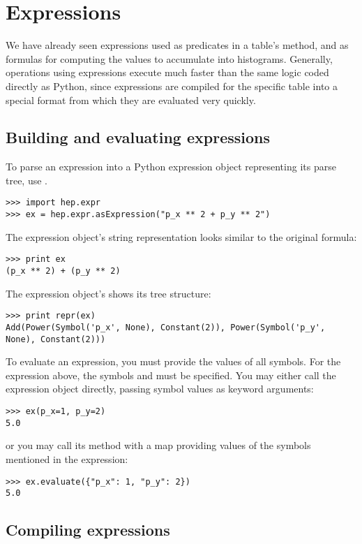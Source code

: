 \chapter{Expressions}

We have already seen expressions used as predicates in a table's
 method, and as formulas for computing the values to
accumulate into histograms.  Generally, operations using expressions
execute much faster than the same logic coded directly as Python, since
expressions are compiled for the specific table into a special format
from which they are evaluated very quickly.

\section{Building and evaluating expressions}

To parse an expression into a Python expression object representing its
parse tree, use .
\begin{verbatim}
>>> import hep.expr
>>> ex = hep.expr.asExpression("p_x ** 2 + p_y ** 2")
\end{verbatim}
The expression object's string representation looks similar to the
original formula:
\begin{verbatim}
>>> print ex
(p_x ** 2) + (p_y ** 2)
\end{verbatim}
The expression object's  shows its tree structure:
\begin{verbatim}
>>> print repr(ex)
Add(Power(Symbol('p_x', None), Constant(2)), Power(Symbol('p_y', None), Constant(2)))
\end{verbatim}

To evaluate an expression, you must provide the values of all symbols.
For the expression above, the symbols  and  must be
specified.  You may either call the expression object directly, passing
symbol values as keyword arguments:
\begin{verbatim}
>>> ex(p_x=1, p_y=2)
5.0
\end{verbatim}
or you may call its  method with a map providing values
of the symbols mentioned in the expression:  
\begin{verbatim}
>>> ex.evaluate({"p_x": 1, "p_y": 2})
5.0
\end{verbatim}

\section{Compiling expressions}

